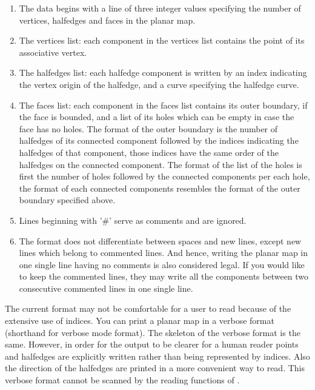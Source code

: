 \begin{ccAdvanced}
\begin{enumerate}
\item The data begins with a line of three integer values specifying
the number of vertices, halfedges and faces in the planar map.
\item The vertices list: each component in the vertices list contains
the point of its associative vertex. 
\item The halfedges list: each halfedge component is written by an
index indicating the vertex origin of the halfedge, and a curve
specifying the halfedge curve.
\item The faces list: each component in the faces list contains its
outer boundary, if the face is bounded, and a list of its holes which
can be empty in case the face has no holes. The format of the outer
boundary is the number of halfedges of its connected component
followed by the indices indicating the halfedges of that component,
those indices have the same order of the halfedges on the connected
component. The format of the list of the holes is first the number of
holes followed by the connected components per each hole, the format
of each connected components resembles the format of the outer
boundary specified above.
\item Lines beginning with '\#' serve as comments and are ignored.
\item The format does not differentiate between spaces and new lines, 
except new lines which belong to commented lines. 
And hence, writing the planar map in one single line having no comments is
also considered legal. If you would like to keep the commented
lines, they may write all the components between two consecutive
commented lines in one single line.

\end{enumerate}

The current format may not be comfortable for a user to read because
of the extensive use of indices. You can print a planar map in a
verbose format (shorthand for verbose mode format).  The skeleton of 
the verbose format is the same. However, in order for the output to be
clearer for a human reader points and halfedges are explicitly written
rather than being represented by indices. Also the direction of the
halfedges are printed in a more convenient way to read. This verbose
format cannot be scanned by the reading functions of
.

\ccExample


\end{ccAdvanced}

